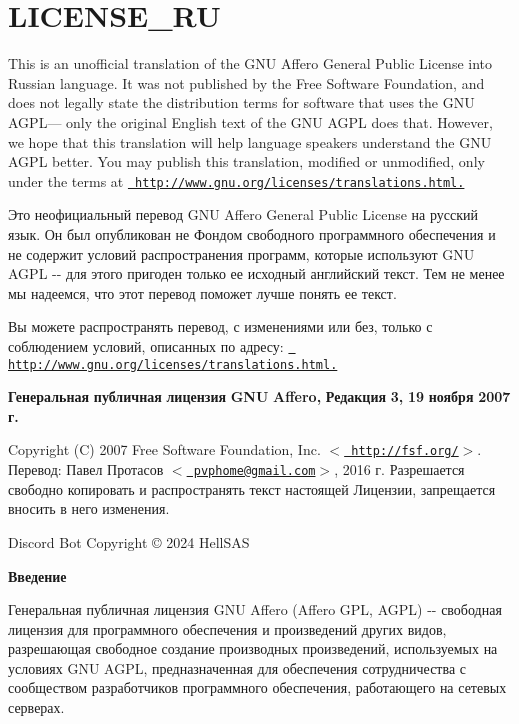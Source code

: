 \chapter{LICENSE\+\_\+\+RU}
\hypertarget{md__l_i_c_e_n_s_e___r_u}{}\label{md__l_i_c_e_n_s_e___r_u}
This is an unofficial translation of the GNU Affero General Public License into Russian language. It was not published by the Free Software Foundation, and does not legally state the distribution terms for software that uses the GNU AGPL--- only the original English text of the GNU AGPL does that. However, we hope that this translation will help language speakers understand the GNU AGPL better. You may publish this translation, modified or unmodified, only under the terms at \href{http://www.gnu.org/licenses/translations.html}{\texttt{ http\+://www.\+gnu.\+org/licenses/translations.\+html.}}

Это неофициальный перевод GNU Affero General Public License на русский язык. Он был опубликован не Фондом свободного программного обеспечения и не содержит условий распространения программ, которые используют GNU AGPL -\/-\/ для этого пригоден только ее исходный английский текст. Тем не менее мы надеемся, что этот перевод поможет лучше понять ее текст.

Вы можете распространять перевод, с изменениями или без, только с соблюдением условий, описанных по адресу\+: \href{http://www.gnu.org/licenses/translations.html}{\texttt{ http\+://www.\+gnu.\+org/licenses/translations.\+html.}}

{\bfseries{Генеральная}} {\bfseries{публичная}} {\bfseries{лицензия}} {\bfseries{GNU}} {\bfseries{Affero,}} {\bfseries{Редакция}} {\bfseries{3,}} {\bfseries{19}} {\bfseries{ноября}} {\bfseries{2007}} {\bfseries{г.}}

Copyright (C) 2007 Free Software Foundation, Inc. \texorpdfstring{$<$}{<}\href{http://fsf.org/}{\texttt{ http\+://fsf.\+org/}}\texorpdfstring{$>$}{>}. Перевод\+: Павел Протасов \texorpdfstring{$<$}{<}\href{mailto:pvphome@gmail.com}{\texttt{ pvphome@gmail.\+com}}\texorpdfstring{$>$}{>}, 2016 г. Разрешается свободно копировать и распространять текст настоящей Лицензии, запрещается вносить в него изменения.

 Discord Bot Copyright © 2024 Hell\+SAS

{\bfseries{Введение}}

Генеральная публичная лицензия GNU Affero (Affero GPL, AGPL) -\/-\/ свободная лицензия для программного обеспечения и произведений других видов, разрешающая свободное создание производных произведений, используемых на условиях GNU AGPL, предназначенная для обеспечения сотрудничества с сообществом разработчиков программного обеспечения, работающего на сетевых серверах.

